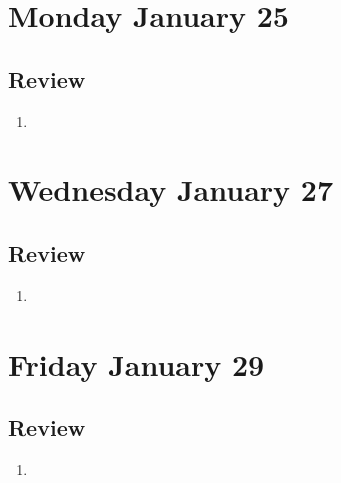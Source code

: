 

\section*{Monday January 25}




\newpage




\newpage
\subsection*{Review}
\begin{enumerate}
\item 
\end{enumerate}


\newpage
\section*{Wednesday January 27}






\newpage







\newpage
\subsection*{Review}
\begin{enumerate}
\item 
\end{enumerate}

\newpage
\section*{Friday January 29}





\newpage





\newpage
\subsection*{Review}
\begin{enumerate}
\item 
\end{enumerate}


